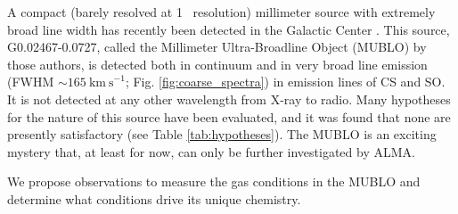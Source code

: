 \documentclass[12pt,a4paper]{article}  %
\newcommand{\kms}{\ensuremath{\mathrm{km~s}^{-1}}\xspace}
\begin{document}
%
A compact (barely resolved at 1\arcsec~ resolution) millimeter source with extremely broad line width has recently been detected in the Galactic Center \citep{Ginsburg2024}.
This source, G0.02467-0.0727, called the Millimeter Ultra-Broadline Object (MUBLO) by those authors, is detected both in continuum and in very broad line emission (FWHM $\sim165~\kms$; Fig. \ref{fig:coarse_spectra}) in emission lines of CS and SO.
It is not detected at any other wavelength from X-ray to radio.
Many hypotheses for the nature of this source have been evaluated, and it was found that none are presently satisfactory (see Table \ref{tab:hypotheses}).
The MUBLO is an exciting mystery that, at least for now, can only be further investigated by ALMA.

\begin{tcolorbox}
\noindent 
We propose observations to measure the gas conditions in the MUBLO and determine what conditions drive its unique chemistry.
\end{tcolorbox}
\end{document}
